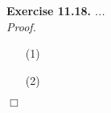 \documentclass{article}
\begin{document}



\textbf{Exercise 11.18.}
\emph{...} \\

\emph{Proof.}
\begin{enumerate}
\item[(1)]
\item[(2)]

\end{enumerate}
$\Box$ \\\\



\end{document}
